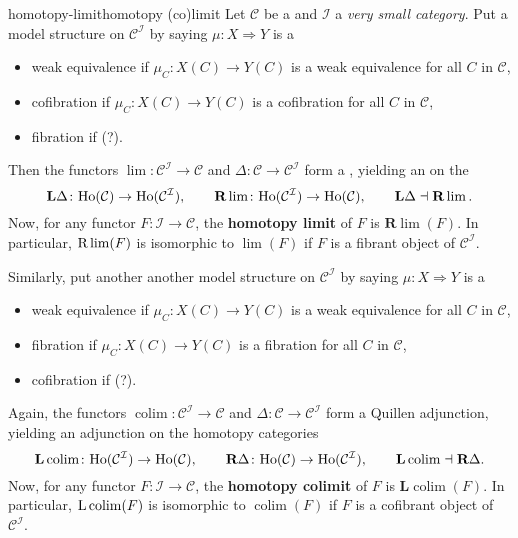 \begin{topic}{homotopy-limit}{homotopy (co)limit}
    Let $\mathcal{C}$ be a  and $\mathcal{I}$ a \textit{very small category}. Put a model structure on $\mathcal{C}^\mathcal{I}$ by saying $\mu : X \Rightarrow Y$ is a 
    \begin{itemize}
        \item weak equivalence if $\mu_C \colon X(C) \to Y(C)$ is a weak equivalence for all $C$ in $\mathcal{C}$,
        \item cofibration if $\mu_C \colon X(C) \to Y(C)$ is a cofibration for all $C$ in $\mathcal{C}$,
        \item fibration if (?).
    \end{itemize}
    Then the functors $\lim \colon \mathcal{C}^\mathcal{I} \to \mathcal{C}$ and $\Delta \colon \mathcal{C} \to \mathcal{C}^\mathcal{I}$ form a , yielding an  on the 
    \[ \textbf{L} \Delta \colon \textup{Ho}(\mathcal{C}) \to \textup{Ho}(\mathcal{C}^\mathcal{I}), \qquad \textbf{R}\lim \colon \textup{Ho}(\mathcal{C}^\mathcal{I}) \to \textup{Ho}(\mathcal{C}), \qquad \textbf{L} \Delta \dashv \textbf{R} \lim . \]
     Now, for any functor $F \colon \mathcal{I} \to \mathcal{C}$, the \textbf{homotopy limit} of $F$ is $\textbf{R}\lim(F)$. In particular, $\textup{R}\lim(F)$ is isomorphic to $\lim(F)$ if $F$ is a fibrant object of $\mathcal{C}^\mathcal{I}$.
     
     Similarly, put another another model structure on $\mathcal{C}^\mathcal{I}$ by saying $\mu : X \Rightarrow Y$ is a
     \begin{itemize}
        \item weak equivalence if $\mu_C \colon X(C) \to Y(C)$ is a weak equivalence for all $C$ in $\mathcal{C}$,
        \item fibration if $\mu_C \colon X(C) \to Y(C)$ is a fibration for all $C$ in $\mathcal{C}$,
        \item cofibration if (?).
    \end{itemize}
    Again, the functors $\operatorname{colim} \colon \mathcal{C}^\mathcal{I} \to \mathcal{C}$ and $\Delta \colon \mathcal{C} \to \mathcal{C}^\mathcal{I}$ form a Quillen adjunction, yielding an adjunction on the homotopy categories
    \[ \textbf{L}\operatorname{colim} \colon \textup{Ho}(\mathcal{C}^\mathcal{I}) \to \textup{Ho}(\mathcal{C}), \qquad \textbf{R} \Delta \colon \textup{Ho}(\mathcal{C}) \to \textup{Ho}(\mathcal{C}^\mathcal{I}), \qquad \textbf{L} \operatorname{colim} \dashv \textbf{R} \Delta . \]
    Now, for any functor $F \colon \mathcal{I} \to \mathcal{C}$, the \textbf{homotopy colimit} of $F$ is $\textbf{L}\operatorname{colim}(F)$. In particular, $\textup{L}\operatorname{colim}(F)$ is isomorphic to $\operatorname{colim}(F)$ if $F$ is a cofibrant object of $\mathcal{C}^\mathcal{I}$.
\end{topic}

